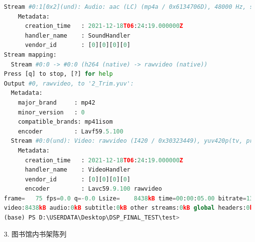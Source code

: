 \documentclass[10pt,UTF8]{ctexart}
\begin{document}
\begin{lstlisting}[language={python}]
  Stream #0:1[0x2](und): Audio: aac (LC) (mp4a / 0x6134706D), 48000 Hz, stereo, fltp, 180 kb/s (default)
    Metadata:
      creation_time   : 2021-12-18T06:24:19.000000Z
      handler_name    : SoundHandler
      vendor_id       : [0][0][0][0]
Stream mapping:
  Stream #0:0 -> #0:0 (h264 (native) -> rawvideo (native))
Press [q] to stop, [?] for help
Output #0, rawvideo, to '2_Trim.yuv':
  Metadata:
    major_brand     : mp42
    minor_version   : 0
    compatible_brands: mp41isom
    encoder         : Lavf59.5.100
  Stream #0:0(und): Video: rawvideo (I420 / 0x30323449), yuv420p(tv, progressive), 320x240 [SAR 27:64 DAR 9:16], q=2-31, 13824 kb/s, 15 fps, 15 tbn (default)
    Metadata:
      creation_time   : 2021-12-18T06:24:19.000000Z
      handler_name    : VideoHandler
      vendor_id       : [0][0][0][0]
      encoder         : Lavc59.9.100 rawvideo
frame=   75 fps=0.0 q=-0.0 Lsize=    8438kB time=00:00:05.00 bitrate=13824.0kbits/s dup=1 drop=71 speed= 5.6x
video:8438kB audio:0kB subtitle:0kB other streams:0kB global headers:0kB muxing overhead: 0.000000%
(base) PS D:\USERDATA\Desktop\DSP_FINAL_TEST\test>
\end{lstlisting}

3. 图书馆内书架陈列
\end{document}
